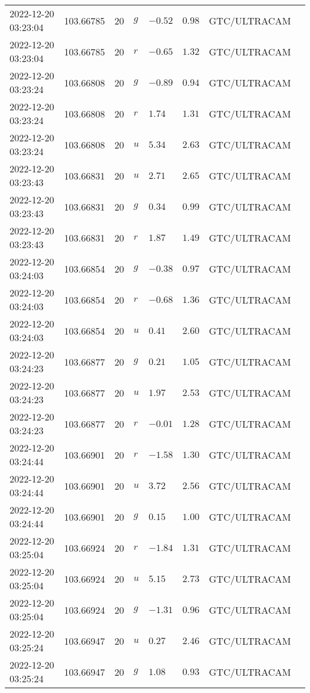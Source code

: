 \documentclass{nature_plusfigure}
\begin{document}
\begin{supplement}
\begin{center}
\begin{longtable}{llllllll}
2022-12-20 03:23:04 & 103.66785 & 20 & $g$ & $-0.52$ & $0.98$ & GTC/ULTRACAM &  \\ 
2022-12-20 03:23:04 & 103.66785 & 20 & $r$ & $-0.65$ & $1.32$ & GTC/ULTRACAM &  \\ 
2022-12-20 03:23:24 & 103.66808 & 20 & $g$ & $-0.89$ & $0.94$ & GTC/ULTRACAM &  \\ 
2022-12-20 03:23:24 & 103.66808 & 20 & $r$ & $1.74$ & $1.31$ & GTC/ULTRACAM &  \\ 
2022-12-20 03:23:24 & 103.66808 & 20 & $u$ & $5.34$ & $2.63$ & GTC/ULTRACAM &  \\ 
2022-12-20 03:23:43 & 103.66831 & 20 & $u$ & $2.71$ & $2.65$ & GTC/ULTRACAM &  \\ 
2022-12-20 03:23:43 & 103.66831 & 20 & $g$ & $0.34$ & $0.99$ & GTC/ULTRACAM &  \\ 
2022-12-20 03:23:43 & 103.66831 & 20 & $r$ & $1.87$ & $1.49$ & GTC/ULTRACAM &  \\ 
2022-12-20 03:24:03 & 103.66854 & 20 & $g$ & $-0.38$ & $0.97$ & GTC/ULTRACAM &  \\ 
2022-12-20 03:24:03 & 103.66854 & 20 & $r$ & $-0.68$ & $1.36$ & GTC/ULTRACAM &  \\ 
2022-12-20 03:24:03 & 103.66854 & 20 & $u$ & $0.41$ & $2.60$ & GTC/ULTRACAM &  \\ 
2022-12-20 03:24:23 & 103.66877 & 20 & $g$ & $0.21$ & $1.05$ & GTC/ULTRACAM &  \\ 
2022-12-20 03:24:23 & 103.66877 & 20 & $u$ & $1.97$ & $2.53$ & GTC/ULTRACAM &  \\ 
2022-12-20 03:24:23 & 103.66877 & 20 & $r$ & $-0.01$ & $1.28$ & GTC/ULTRACAM &  \\ 
2022-12-20 03:24:44 & 103.66901 & 20 & $r$ & $-1.58$ & $1.30$ & GTC/ULTRACAM &  \\ 
2022-12-20 03:24:44 & 103.66901 & 20 & $u$ & $3.72$ & $2.56$ & GTC/ULTRACAM &  \\ 
2022-12-20 03:24:44 & 103.66901 & 20 & $g$ & $0.15$ & $1.00$ & GTC/ULTRACAM &  \\ 
2022-12-20 03:25:04 & 103.66924 & 20 & $r$ & $-1.84$ & $1.31$ & GTC/ULTRACAM &  \\ 
2022-12-20 03:25:04 & 103.66924 & 20 & $u$ & $5.15$ & $2.73$ & GTC/ULTRACAM &  \\ 
2022-12-20 03:25:04 & 103.66924 & 20 & $g$ & $-1.31$ & $0.96$ & GTC/ULTRACAM &  \\ 
2022-12-20 03:25:24 & 103.66947 & 20 & $u$ & $0.27$ & $2.46$ & GTC/ULTRACAM &  \\ 
2022-12-20 03:25:24 & 103.66947 & 20 & $g$ & $1.08$ & $0.93$ & GTC/ULTRACAM &  \\ 

\end{longtable}
\end{center}
\end{supplement}
\end{document}
